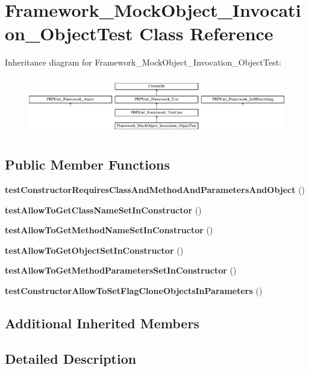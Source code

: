 \section{Framework\+\_\+\+Mock\+Object\+\_\+\+Invocation\+\_\+\+Object\+Test Class Reference}
\label{class_framework___mock_object___invocation___object_test}
Inheritance diagram for Framework\+\_\+\+Mock\+Object\+\_\+\+Invocation\+\_\+\+Object\+Test\+:\begin{figure}[H]
\begin{center}
\leavevmode
\includegraphics[height=2.574713cm]{class_framework___mock_object___invocation___object_test}
\end{center}
\end{figure}
\subsection*{Public Member Functions}
\begin{DoxyCompactItemize}
\item 
{\bf test\+Constructor\+Requires\+Class\+And\+Method\+And\+Parameters\+And\+Object} ()
\item 
{\bf test\+Allow\+To\+Get\+Class\+Name\+Set\+In\+Constructor} ()
\item 
{\bf test\+Allow\+To\+Get\+Method\+Name\+Set\+In\+Constructor} ()
\item 
{\bf test\+Allow\+To\+Get\+Object\+Set\+In\+Constructor} ()
\item 
{\bf test\+Allow\+To\+Get\+Method\+Parameters\+Set\+In\+Constructor} ()
\item 
{\bf test\+Constructor\+Allow\+To\+Set\+Flag\+Clone\+Objects\+In\+Parameters} ()
\end{DoxyCompactItemize}
\subsection*{Additional Inherited Members}


\subsection{Detailed Description}


